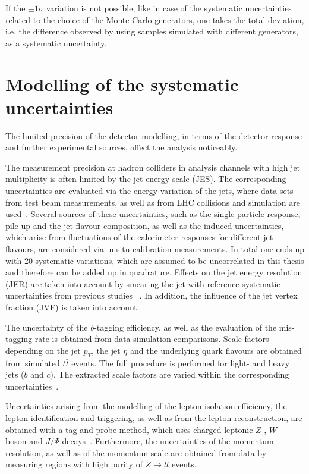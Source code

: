  If the $\pm 1 \sigma$ variation is not possible, like in case of the systematic uncertainties  related to the choice of the Monte Carlo generators, one takes the total deviation, i.e. the difference observed by using samples simulated with different generators, as a systematic uncertainty. 


	

\section{Modelling of the systematic uncertainties }
The limited precision of the detector modelling, in terms of the detector response and further experimental sources, affect the analysis noticeably. 

 The measurement precision at hadron colliders in analysis channels with high jet multiplicity is often limited by the jet energy scale (JES). The corresponding uncertainties are evaluated via the energy variation of the jets, where
data sets from test beam measurements, as well as from LHC collisions and simulation are used~\cite{Aad:2011he, Aad:2012ag, Aad:2012vm,Aad:2014bia}. Several sources of these uncertainties, such as the single-particle response, pile-up and the jet flavour composition, as well as the induced uncertainties, which arise from fluctuations of the calorimeter responses for different jet flavours, 
 are considered via in-situ calibration measurements.  In total one ends up with 20 systematic variations, which are assumed to be uncorrelated in this thesis and therefore can be added up in quadrature. 
 Effects on the jet energy resolution (JER) are taken into account by smearing the jet with reference systematic uncertainties  from previous studies ~\cite{ATL-PHYS-PUB-2015-015}.
 In addition, the influence of the  jet vertex fraction (JVF)  is taken into account.
 

 The uncertainty of the $b$-tagging efficiency, as well as the evaluation of the mis-tagging rate is obtained from data-simulation comparisons. Scale factors depending on the jet $p_T$, the jet $\eta$ and the underlying quark flavours are obtained from simulated $t\bar{t}$ events.  
The full procedure is performed  for  light- and heavy jets ($b$ and $c$). The extracted scale factors are varied within the corresponding uncertainties~\cite{ATLAS-CONF-2014-046, ATLAS-CONF-2014-004, ATL-PHYS-PUB-2015-022}.


 Uncertainties arising from the modelling of the lepton isolation efficiency, the lepton identification and triggering, as well as from the lepton reconstruction, are obtained with a tag-and-probe method, which uses charged leptonic  $Z$-, $W-$boson and $J/\Psi$ decays~\cite{ATLAS:2016iqc,ATL-PHYS-PUB-2016-015,Aad:2011mk,Aad:2016jkr}. Furthermore, the uncertainties of the  momentum resolution,  as well as of the momentum scale  are  obtained from data by measuring regions with high purity of  $Z \rightarrow ll$ events.

